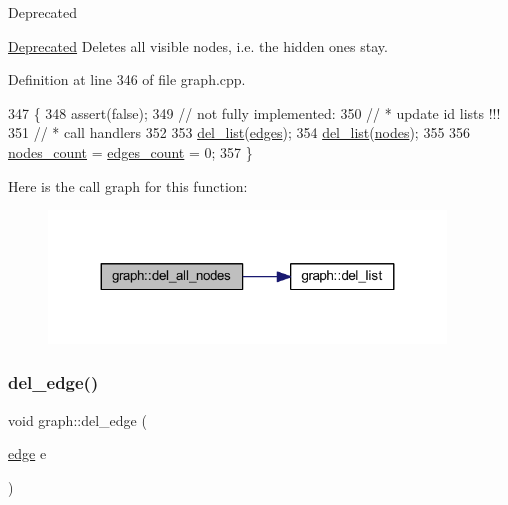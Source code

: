 \begin{DoxyRefDesc}{Deprecated}
\item[\mbox{\hyperlink{deprecated__deprecated000001}{Deprecated}}]Deletes all visible nodes, i.\+e. the hidden ones stay. \end{DoxyRefDesc}


Definition at line 346 of file graph.\+cpp.


\begin{DoxyCode}
347 \{
348     assert(\textcolor{keyword}{false});
349     \textcolor{comment}{// not fully implemented:}
350     \textcolor{comment}{//  * update id lists !!!}
351     \textcolor{comment}{//  * call handlers}
352 
353     \mbox{\hyperlink{classgraph_a23f0a5fb311b7d71bb9dfc4e8aedef35}{del\_list}}(\mbox{\hyperlink{classgraph_ab5b1c610cca1bcf72b05aacc28a48153}{edges}});
354     \mbox{\hyperlink{classgraph_a23f0a5fb311b7d71bb9dfc4e8aedef35}{del\_list}}(\mbox{\hyperlink{classgraph_a4ea0592e8eb7c26c5abad24546907726}{nodes}});
355 
356     \mbox{\hyperlink{classgraph_a1f59223d0bcf647920963d7a661dd74a}{nodes\_count}} = \mbox{\hyperlink{classgraph_af560ff4263ad165c166a46084e781b4a}{edges\_count}} = 0;
357 \}
\end{DoxyCode}
Here is the call graph for this function\+:\nopagebreak
\begin{figure}[H]
\begin{center}
\leavevmode
\includegraphics[width=299pt]{classgraph_ad0ca1578643a51f96a76a846f14558df_cgraph}
\end{center}
\end{figure}
\mbox{\label{classgraph_ad9356508c49c542dfd4b7169297387c6}} 
\subsubsection{\texorpdfstring{del\+\_\+edge()}{del\_edge()}}
{\footnotesize\ttfamily void graph\+::del\+\_\+edge (\begin{DoxyParamCaption}\item[{\mbox{\hyperlink{classedge}{edge}}}]{e }\end{DoxyParamCaption})\hspace{0.3cm}{\ttfamily [inherited]}}


